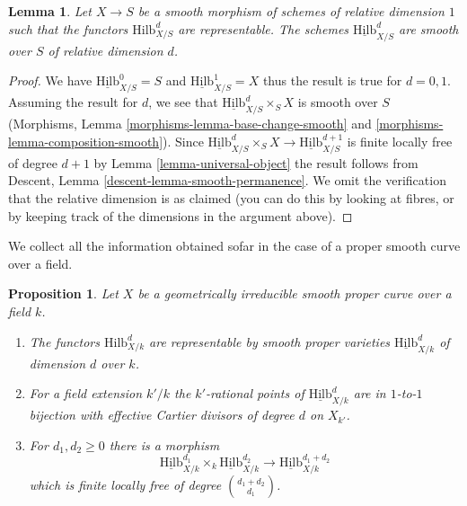 \documentclass{stacks-project}
\theoremstyle{plain}
\newtheorem{proposition}[subsection]{Proposition}
\newtheorem{lemma}[subsection]{Lemma}
\theoremstyle{definition}
\theoremstyle{remark}
\numberwithin{equation}{subsection}
\def\Hilbfunctor{\mathrm{Hilb}}
\begin{document}
\begin{lemma}
\label{lemma-hilb-d-smooth}
Let $X \to S$ be a smooth morphism of schemes of relative dimension $1$
such that the functors $\Hilbfunctor^d_{X/S}$ are representable. The
schemes $\underline{\Hilbfunctor}^d_{X/S}$ are smooth over $S$ of
relative dimension $d$.
\end{lemma}

\begin{proof}
We have $\underline{\Hilbfunctor}^0_{X/S} = S$ and
$\underline{\Hilbfunctor}^1_{X/S} = X$ thus the result is true for $d = 0, 1$.
Assuming the result for $d$, we see that
$\underline{\Hilbfunctor}^d_{X/S} \times_S X$ is smooth over $S$
(Morphisms, Lemma \ref{morphisms-lemma-base-change-smooth} and
\ref{morphisms-lemma-composition-smooth}). Since
$\underline{\Hilbfunctor}^d_{X/S} \times_S X \to
\underline{\Hilbfunctor}^{d + 1}_{X/S}$
is finite locally free of degree $d + 1$ by
Lemma \ref{lemma-universal-object}
the result follows from
Descent, Lemma \ref{descent-lemma-smooth-permanence}.
We omit the verification that the relative dimension is
as claimed (you can do this by looking at fibres, or by
keeping track of the dimensions in the argument above).
\end{proof}

\noindent
We collect all the information obtained sofar in the case of
a proper smooth curve over a field.

\begin{proposition}
\label{proposition-hilb-d}
Let $X$ be a geometrically irreducible smooth proper curve over a field $k$.
\begin{enumerate}
\item The functors $\Hilbfunctor^d_{X/k}$ are representable by smooth
proper varieties $\underline{\Hilbfunctor}^d_{X/k}$ of dimension
$d$ over $k$.
\item For a field extension $k'/k$ the $k'$-rational points
of $\underline{\Hilbfunctor}^d_{X/k}$ are in $1$-to-$1$ bijection
with effective Cartier divisors of degree $d$ on $X_{k'}$.
\item For $d_1, d_2 \geq 0$ there is a morphism
$$
\underline{\Hilbfunctor}^{d_1}_{X/k}
\times_k
\underline{\Hilbfunctor}^{d_2}_{X/k}
\longrightarrow
\underline{\Hilbfunctor}^{d_1 + d_2}_{X/k}
$$
which is finite locally free of degree ${d_1 + d_2 \choose d_1}$.
\end{enumerate}
\end{proposition}
\end{document}
